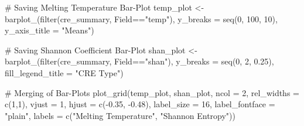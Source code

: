 \documentclass[
  letterpaper,
]{article}
\newenvironment{Shaded}{\begin{snugshade}}{\end{snugshade}}
\newcommand{\AttributeTok}[1]{\textcolor[rgb]{0.40,0.45,0.13}{#1}}
\newcommand{\CommentTok}[1]{\textcolor[rgb]{0.37,0.37,0.37}{#1}}
\newcommand{\DecValTok}[1]{\textcolor[rgb]{0.68,0.00,0.00}{#1}}
\newcommand{\FloatTok}[1]{\textcolor[rgb]{0.68,0.00,0.00}{#1}}
\newcommand{\FunctionTok}[1]{\textcolor[rgb]{0.28,0.35,0.67}{#1}}
\newcommand{\NormalTok}[1]{\textcolor[rgb]{0.00,0.23,0.31}{#1}}
\newcommand{\OtherTok}[1]{\textcolor[rgb]{0.00,0.23,0.31}{#1}}
\newcommand{\SpecialCharTok}[1]{\textcolor[rgb]{0.37,0.37,0.37}{#1}}
\newcommand{\StringTok}[1]{\textcolor[rgb]{0.13,0.47,0.30}{#1}}
\begin{document}
\begin{Shaded}
\begin{Highlighting}[]
\CommentTok{\# Saving Melting Temperature Bar{-}Plot}
\NormalTok{temp\_plot }\OtherTok{\textless{}{-}} \FunctionTok{barplot\_}\NormalTok{(}\FunctionTok{filter}\NormalTok{(cre\_summary, Field}\SpecialCharTok{==}\StringTok{"temp"}\NormalTok{), }
                      \AttributeTok{y\_breaks =} \FunctionTok{seq}\NormalTok{(}\DecValTok{0}\NormalTok{, }\DecValTok{100}\NormalTok{, }\DecValTok{10}\NormalTok{), }
                      \AttributeTok{y\_axis\_title =} \StringTok{"Means"}\NormalTok{)}

\CommentTok{\# Saving Shannon Coefficient Bar{-}Plot}
\NormalTok{shan\_plot }\OtherTok{\textless{}{-}} \FunctionTok{barplot\_}\NormalTok{(}\FunctionTok{filter}\NormalTok{(cre\_summary, Field}\SpecialCharTok{==}\StringTok{"shan"}\NormalTok{), }
                      \AttributeTok{y\_breaks =} \FunctionTok{seq}\NormalTok{(}\DecValTok{0}\NormalTok{, }\DecValTok{2}\NormalTok{, }\FloatTok{0.25}\NormalTok{), }
                      \AttributeTok{fill\_legend\_title =} \StringTok{"CRE Type"}\NormalTok{)}

\CommentTok{\# Merging of Bar{-}Plots}
\FunctionTok{plot\_grid}\NormalTok{(temp\_plot, shan\_plot,  }
    \AttributeTok{ncol =} \DecValTok{2}\NormalTok{, }\AttributeTok{rel\_widths =} \FunctionTok{c}\NormalTok{(}\DecValTok{1}\NormalTok{,}\DecValTok{1}\NormalTok{), }
    \AttributeTok{vjust =} \DecValTok{1}\NormalTok{, }\AttributeTok{hjust =} \FunctionTok{c}\NormalTok{(}\SpecialCharTok{{-}}\FloatTok{0.35}\NormalTok{, }\SpecialCharTok{{-}}\FloatTok{0.48}\NormalTok{),}
    \AttributeTok{label\_size =} \DecValTok{16}\NormalTok{, }\AttributeTok{label\_fontface =} \StringTok{"plain"}\NormalTok{,}
    \AttributeTok{labels =} \FunctionTok{c}\NormalTok{(}\StringTok{"Melting Temperature"}\NormalTok{, }\StringTok{"Shannon Entropy"}\NormalTok{)) }
\end{Highlighting}
\end{Shaded}
\end{document}
